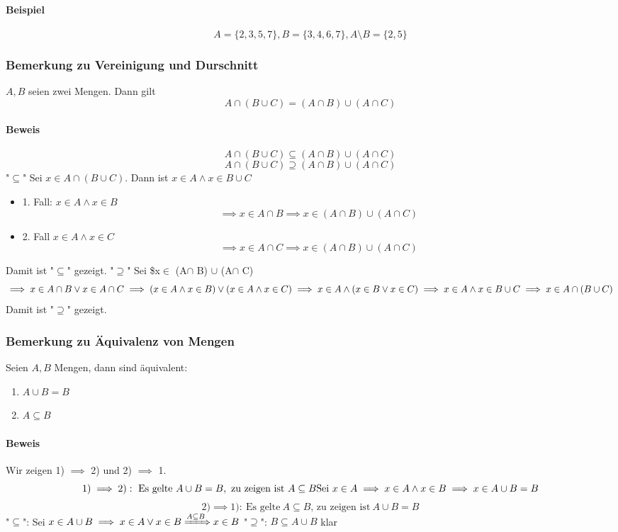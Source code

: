 \documentclass[a4paper]{scrartcl}
\theoremstyle{definition}
\theoremstyle{plain}
\theoremstyle{plain}
\theoremstyle{remark}
\theoremstyle{remark}
\theoremstyle{remark}
\theoremstyle{remark}
\theoremstyle{remark}
\begin{document}
\paragraph{Beispiel}
\label{sec-2-4-8-1}
\[A=\{2,3,5,7\}, B=\{3,4,6,7\}, A\setminus B = \{2,5\}\]
\subsubsection{Bemerkung zu Vereinigung und Durschnitt}
\label{sec-2-4-9}
$A,B$ seien zwei Mengen. Dann gilt \[A\cap (B\cup C) = (A\cap B) \cup (A\cap C)\]
\paragraph{Beweis}
\label{sec-2-4-9-1}
\[A\cap(B\cup C) \subseteq (A\cap B) \cup (A\cap C)\]
\[A\cap(B\cup C) \supseteq (A\cap B) \cup (A\cap C)\]
"$\subseteq$" Sei $x\in A \cap (B\cup C)$. Dann ist $x\in A \wedge x\in B\cup C$
\begin{itemize}
\item 1. Fall: $x\in A \wedge x\in B$
       \[\implies x\in A\cap B \implies x \in (A\cap B) \cup (A\cap C)\]
\item 2. Fall $x\in A \wedge x\in C$
       \[\implies x\in A\cap C \implies x\in (A\cap B)\cup(A\cap C)\]
\end{itemize}
Damit ist "$\subseteq$" gezeigt.
"$\supseteq$" Sei \$x$\in$ (A$\cap$ B) $\cup$ (A$\cap$ C)
\[\implies x\in A\cap B \vee x\in A\cap C \\ \implies (x\in A \wedge x\in B) \vee (x\in A \wedge x\in C) \\ \implies x\in A \wedge (x\in B\vee x\in C) \\ \implies x\in A \wedge x\in B\cup C \\ \implies x\in A\cap (B\cup C)\]
Damit ist "$\supseteq$" gezeigt.
\subsubsection{Bemerkung zu Äquivalenz von Mengen}
\label{sec-2-4-10}
Seien $A,B$ Mengen, dann sind äquivalent:
\begin{enumerate}
\item $A\cup B = B$
\item $A\subseteq B$
\end{enumerate}
\paragraph{Beweis}
\label{sec-2-4-10-1}
Wir zeigen 1) $\implies$ 2) und 2) $\implies$ 1.
\[1) \implies 2):~\text{Es gelte}~A\cup B = B,~\text{zu zeigen ist}~A\subseteq B \\ \text{Sei}~x\in A \implies x\in A \wedge x \in B \implies x\in A\cup B = B\]
\[2) \implies 1):~\text{Es gelte}~A\subseteq B\text{, zu zeigen ist}~A\cup B = B \]
"$\subseteq$": Sei $x\in A\cup B \implies x\in A \vee x\in B \xRightarrow{A\subseteq B} x\in B$
"$\supseteq$": $B\subseteq A\cup B$ klar
\end{document}
